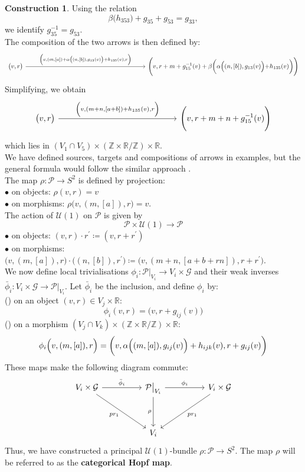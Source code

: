 \documentclass{article}
\theoremstyle{plain}
\theoremstyle{definition}
\newtheorem{const}[thm]{Construction}
\newcommand{\rNum}[1]{\lowercase\expandafter{\romannumeral #1\relax}}
\begin{document}
\begin{const}
Using the relation
\begin{equation*}
\beta\bigl(h_{3 5 3}\bigl) + g_{3 5} + g_{5 3} = g_{3 3},
\end{equation*}
we identify $g^{-1}_{35} = g_{53}$. \\
The composition of the two arrows is then defined by:
\[
\begin{tikzcd}[row sep=huge,column sep=huge]
\big(v,r\big) \arrow[rrrr,"{\Bigl(v,(m,[a])+\alpha\bigl((n,[b]),g_{1 3}(v)\bigr)+h_{1 3 5}(v),r\Bigr)}"] & & & & \Biggl(v,r+m+g^{-1}_{1 5}(v)+\beta\biggl(\alpha\Bigl((n,[b]),g_{1 3}(v)\Bigl)+h_{1 3 5}(v)\biggr)\Biggr)
\end{tikzcd}
\]
Simplifying, we obtain
\[
\begin{tikzcd}[row sep=huge,column sep=huge]
\big(v,r\big) \arrow[rrr,"{\Bigl(v,(m+n,[a+b])+h_{1 3 5}(v),r\Bigr)}"] & & & \Biggl(v,r+m+n+g^{-1}_{1 5}(v)\Biggr)
\end{tikzcd}
\]
which lies in $(V_1 \cap V_5) \times (\mathbb{Z} \times \mathbb{R}/\mathbb{Z}) \times \mathbb{R}$. \\
We have defined sources, targets and compositions of arrows in examples, but the general formula would follow the similar approach \cite[Remark 2.16 on page 583]{MR2805195}. \\
The map $\rho:\mathcal{P} \longrightarrow S^2$ is defined by projection: \\
$\bullet$ on objects: $\rho(v,r) = v$ \\
$\bullet$ on morphisms: $\rho\big(v,(m,[a]),r\big) = v$. \\
The action of $\mathcal{U}(1)$ on $\mathcal{P}$ is given by
$$\mathcal{P} \times \mathcal{U}(1) \longrightarrow \mathcal{P}$$
$\bullet$ on objects: $(v,r) \cdot r^\prime \coloneq (v,r + r^\prime)$ \\
$\bullet$ on morphisms: $\big(v,(m,[a]),r\big) \cdot \big((n,[b]),r^\prime\big) \coloneq \big(v,(m+n,[a+b+rn]),r+r^\prime\big)$. \\
We now define local trivialisations $\phi_{i}:\mathcal{P} \big\vert_{V_i} \longrightarrow V_i \times \mathcal{G}$ and their weak inverses $\bar{\phi}_{i}:V_i \times \mathcal{G} \longrightarrow \mathcal{P} \big\vert_{V_i}$. Let $\bar{\phi}_{i}$ be the inclusion, and define $\phi_{i}$ by: \\
(\rNum{1}) on an object $(v,r) \in V_j \times \mathbb{R}$:
\[
\phi_{i}(v,r) = \big(v,r+g_{i j}(v)\big)
\]
(\rNum{2}) on a morphism $(V_j \cap V_k) \times (\mathbb{Z} \times \mathbb{R}/\mathbb{Z}) \times \mathbb{R}$:
\[\phi_{i}\Bigl(v,(m,[a]),r\Bigr) = \biggl(v,\alpha\Bigl((m,[a]),g_{i j}(v)\Bigr)+h_{i j k}(v),r+g_{i j}(v)\biggr)
\]
These maps make the following diagram commute:
\[
\begin{tikzcd}[row sep=huge,column sep=huge]
V_i \times \mathcal{G} \arrow[r,"\bar{\phi}_{i}"] \arrow[dr,"pr_1"'] & \mathcal{P} \big\vert_{V_i} \arrow[r,"\phi_{i}"] \arrow[d,"\rho"'] & V_i \times \mathcal{G} \arrow[dl,"pr_1"] \\
& V_i &
\end{tikzcd}
\]
Thus, we have constructed a principal $\mathcal{U}(1)$-bundle $\rho:\mathcal{P} \longrightarrow S^2$. The map $\rho$ will be referred to as the \textbf{categorical Hopf map}.
\end{const}
\end{document}
